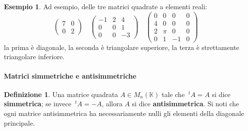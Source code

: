 \documentclass{article}
\theoremstyle{plain}
\theoremstyle{definition}
\newtheorem{defn}{Definizione}[section]
\newtheorem{exmp}{Esempio}[section]
\theoremstyle{remark}
\begin{document}
\vspace{10pt}

\begin{exmp}
    Ad esempio, delle tre matrici quadrate a elementi reali:
\[
\begin{pmatrix}
7 & 0 \\
0 & 2
\end{pmatrix} \quad
\begin{pmatrix}
    -1 & 2 & 4 \\
    0 & 0 & 1 \\
    0 & 0 & -3
\end{pmatrix} \quad
\begin{pmatrix}
0 & 0 & 0 & 0 \\
4 & 0 & 0 & 0 \\
2 & \pi & 0 & 0 \\
0 & 1 & -1 & 0 
\end{pmatrix}
\]
la prima è diagonale, la seconda è triangolare superiore, la terza è strettamente triangolare inferiore.
\end{exmp}

\vspace{10pt}

\paragraph{Matrici simmetriche e antisimmetriche}
\begin{bxthm}
\begin{defn}
    Una matrice quadrata \( A \in M_n(\mathbb{K}) \) tale che \( \ ^{t}A = A \) si dice \textbf{simmetrica}; se invece \( \ ^{t}A = -A \), allora \( A \) si dice \textbf{antisimmetrica}.
    Si noti che ogni matrice antisimmetrica ha necessariamente nulli gli elementi della diagonale principale.
\end{defn}
\end{bxthm}

\vspace{10pt}
\end{document}
